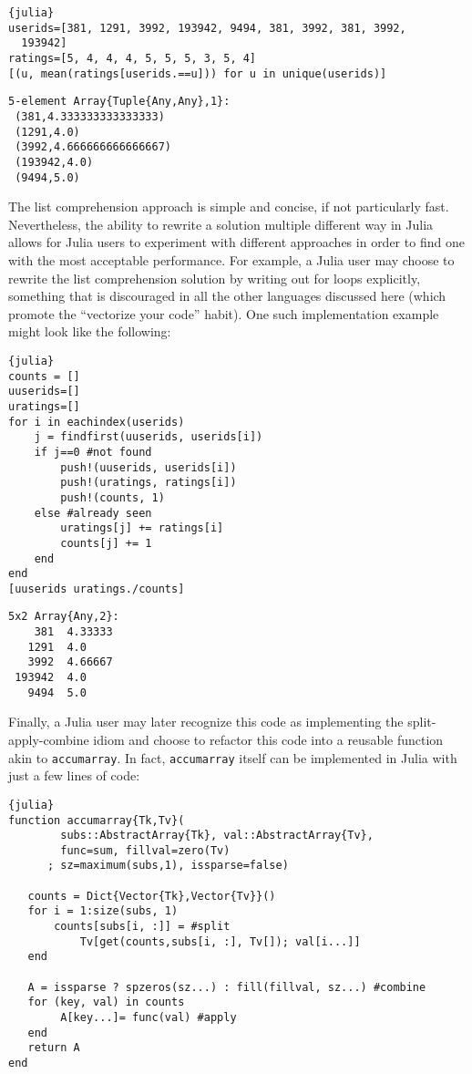 \documentclass[11pt]{asaproc}
\begin{document}
\begin{lstlisting}{julia}
userids=[381, 1291, 3992, 193942, 9494, 381, 3992, 381, 3992,
  193942]
ratings=[5, 4, 4, 4, 5, 5, 5, 3, 5, 4]
[(u, mean(ratings[userids.==u])) for u in unique(userids)]
\end{lstlisting}
\begin{verbatim}
5-element Array{Tuple{Any,Any},1}:
 (381,4.333333333333333)
 (1291,4.0)
 (3992,4.666666666666667)
 (193942,4.0)
 (9494,5.0)
\end{verbatim}

The list comprehension approach is simple and concise, if not particularly
fast. Nevertheless, the ability to rewrite a solution multiple different way in
Julia allows for Julia users to experiment with different approaches in order
to find one with the most acceptable performance. For example, a Julia user may
choose to rewrite the list comprehension solution by writing out for loops
explicitly, something that is discouraged in all the other languages discussed
here (which promote the ``vectorize your code'' habit). One such implementation
example might look like the following:

\begin{lstlisting}{julia}
counts = []
uuserids=[]
uratings=[]
for i in eachindex(userids)
    j = findfirst(uuserids, userids[i])
    if j==0 #not found
        push!(uuserids, userids[i])
        push!(uratings, ratings[i])
        push!(counts, 1)
    else #already seen
        uratings[j] += ratings[i]
        counts[j] += 1
    end
end
[uuserids uratings./counts]
\end{lstlisting}
\begin{verbatim}
5x2 Array{Any,2}:
    381  4.33333
   1291  4.0
   3992  4.66667
 193942  4.0
   9494  5.0
\end{verbatim}

Finally, a Julia user may later recognize this code as implementing the
split-apply-combine idiom and choose to refactor this code into a reusable
function akin to \lstinline|accumarray|. In fact, \lstinline|accumarray| itself
can be implemented in Julia with just a few lines of code:

\begin{lstlisting}{julia}
function accumarray{Tk,Tv}(
        subs::AbstractArray{Tk}, val::AbstractArray{Tv},
        func=sum, fillval=zero(Tv)
      ; sz=maximum(subs,1), issparse=false)

   counts = Dict{Vector{Tk},Vector{Tv}}()
   for i = 1:size(subs, 1)
       counts[subs[i, :]] = #split
           Tv[get(counts,subs[i, :], Tv[]); val[i...]]
   end

   A = issparse ? spzeros(sz...) : fill(fillval, sz...) #combine
   for (key, val) in counts
        A[key...]= func(val) #apply
   end
   return A
end
\end{lstlisting}
\end{document}
